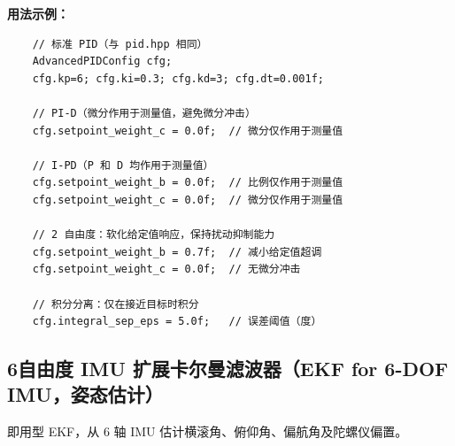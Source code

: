 \textbf{用法示例：}
\begin{verbatim}
    // 标准 PID（与 pid.hpp 相同）
    AdvancedPIDConfig cfg;
    cfg.kp=6; cfg.ki=0.3; cfg.kd=3; cfg.dt=0.001f;

    // PI-D（微分作用于测量值，避免微分冲击）
    cfg.setpoint_weight_c = 0.0f;  // 微分仅作用于测量值

    // I-PD（P 和 D 均作用于测量值）
    cfg.setpoint_weight_b = 0.0f;  // 比例仅作用于测量值
    cfg.setpoint_weight_c = 0.0f;  // 微分仅作用于测量值

    // 2 自由度：软化给定值响应，保持扰动抑制能力
    cfg.setpoint_weight_b = 0.7f;  // 减小给定值超调
    cfg.setpoint_weight_c = 0.0f;  // 无微分冲击

    // 积分分离：仅在接近目标时积分
    cfg.integral_sep_eps = 5.0f;   // 误差阈值（度）
\end{verbatim}

\subsection{6自由度 IMU 扩展卡尔曼滤波器（EKF for 6-DOF IMU，姿态估计）}

即用型 EKF，从 6 轴 IMU 估计横滚角、俯仰角、偏航角及陀螺仪偏置。


